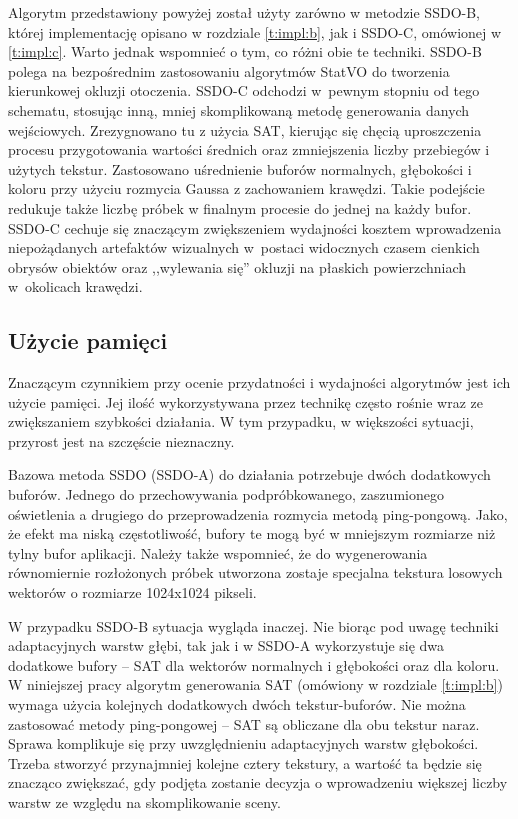 		Algorytm przedstawiony powyżej został użyty zarówno w metodzie SSDO-B, której implementację opisano w rozdziale \ref{t:impl:b}, jak i SSDO-C, omówionej w \ref{t:impl:c}. Warto jednak wspomnieć o tym, co różni obie te techniki. SSDO-B polega na bezpośrednim zastosowaniu algorytmów StatVO do tworzenia kierunkowej okluzji otoczenia. SSDO-C odchodzi w~pewnym stopniu od tego schematu, stosując inną, mniej skomplikowaną metodę generowania danych wejściowych. Zrezygnowano tu z użycia SAT, kierując się chęcią uproszczenia procesu przygotowania wartości średnich oraz zmniejszenia liczby przebiegów i użytych tekstur. Zastosowano uśrednienie buforów normalnych, głębokości i koloru przy użyciu rozmycia Gaussa z zachowaniem krawędzi. Takie podejście redukuje także liczbę próbek w finalnym procesie do jednej na każdy bufor. SSDO-C cechuje się znaczącym zwiększeniem wydajności kosztem wprowadzenia niepożądanych artefaktów wizualnych w~postaci widocznych czasem cienkich obrysów obiektów oraz ,,wylewania się'' okluzji na płaskich powierzchniach w~okolicach krawędzi.
		
		\pagebreak
		
		\subsection{Użycie pamięci}
		\label{t:algorytm:stat:memory}
		
		Znaczącym czynnikiem przy ocenie przydatności i wydajności algorytmów jest ich użycie pamięci. Jej ilość wykorzystywana przez technikę często rośnie wraz ze zwiększaniem szybkości działania. W tym przypadku, w większości sytuacji, przyrost jest na szczęście nieznaczny. 
		
		Bazowa metoda SSDO (SSDO-A) do działania potrzebuje dwóch dodatkowych buforów. Jednego do przechowywania podpróbkowanego, zaszumionego oświetlenia a drugiego do przeprowadzenia rozmycia metodą ping-pongową. Jako, że efekt ma niską częstotliwość, bufory te mogą być w mniejszym rozmiarze niż tylny bufor aplikacji. Należy także wspomnieć, że do wygenerowania równomiernie rozłożonych próbek utworzona zostaje specjalna tekstura losowych wektorów o rozmiarze 1024x1024 pikseli. 
		
		W przypadku SSDO-B sytuacja wygląda inaczej. Nie biorąc pod uwagę techniki adaptacyjnych warstw głębi, tak jak i w SSDO-A wykorzystuje się dwa dodatkowe bufory -- SAT dla wektorów normalnych i głębokości oraz dla koloru. W niniejszej pracy algorytm generowania SAT (omówiony w rozdziale \ref{t:impl:b}) wymaga użycia kolejnych dodatkowych dwóch tekstur-buforów. Nie można zastosować metody ping-pongowej -- SAT są obliczane dla obu tekstur naraz. Sprawa komplikuje się przy uwzględnieniu adaptacyjnych warstw głębokości. Trzeba stworzyć przynajmniej kolejne cztery tekstury, a wartość ta będzie się znacząco zwiększać, gdy podjęta zostanie decyzja o wprowadzeniu większej liczby warstw ze względu na skomplikowanie sceny.
		
